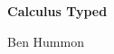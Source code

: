 




\pagestyle{empty}

\begin{center}
\vspace*{2in}
{\huge \bfseries Calculus Typed}
\par
\vspace{0.3in}
{\large Ben Hummon}
\end{center}


\cleardoublepage

\pagestyle{fancy}
